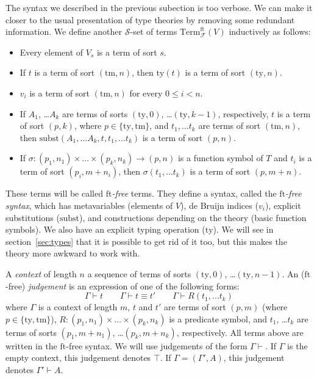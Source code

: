 \documentclass[reqno]{amsart}
\theoremstyle{definition}
\theoremstyle{remark}
\newcommand{\fs}[1]{\mathrm{#1}}
\newcommand{\Term}{\fs{Term}}
\newcommand{\subst}{\fs{subst}}
\newcommand{\ft}{\fs{ft}}
\newcommand{\ty}{\fs{ty}}
\newcommand{\tm}{\fs{tm}}
\numberwithin{figure}{section}
\begin{document}
The syntax we described in the previous subection is too verbose.
We can make it closer to the usual presentation of type theories by removing some redundant information.
We define another $\mathcal{S}$-set of terms $\Term^\ft_\mathcal{F}(V)$ inductively as follows:
\begin{itemize}
\item Every element of $V_s$ is a term of sort $s$.
\item If $t$ is a term of sort $(\tm,n)$, then $\ty(t)$ is a term of sort $(\ty,n)$.
\item $v_i$ is a term of sort $(\tm,n)$ for every $0 \leq i < n$.
\item If $A_1$, \ldots $A_k$ are terms of sorts $(\ty,0)$, \ldots $(\ty,k-1)$, respectively, $t$ is a term of sort $(p,k)$, where $p \in \{ \ty, \tm \}$, and $t_1, \ldots t_k$ are terms of sort $(\tm,n)$, then $\subst(A_1, \ldots A_k, t, t_1, \ldots t_k)$ is a term of sort $(p,n)$.
\item If $\sigma : (p_1,n_1) \times \ldots \times (p_k,n_k) \to (p,n)$ is a function symbol of $T$ and $t_i$ is a term of sort $(p_i,m+n_i)$, then $\sigma(t_1, \ldots t_k)$ is a term of sort $(p,m+n)$.
\end{itemize}
These terms will be called \emph{$\ft$-free} terms.
They define a syntax, called the \emph{$\ft$-free syntax}, which has metavariables (elements of $V$), de Bruijn indices ($v_i$), explicit substitutions ($\subst$), and constructions depending on the theory (basic function symbols).
We also have an explicit typing operation ($\ty$).
We will see in section~\ref{sec:types} that it is possible to get rid of it too, but this makes the theory more awkward to work with.

A \emph{context} of length $n$ a sequence of terms of sorts $(\ty,0)$, \ldots $(\ty,n-1)$.
An ($\ft$-free) \emph{judgement} is an expression of one of the following forms:
\[ \Gamma \vdash t \qquad \Gamma \vdash t \equiv t' \qquad \Gamma \vdash R(t_1, \ldots t_k) \]
where $\Gamma$ is a context of length $m$, $t$ and $t'$ are terms of sort $(p,m)$ (where $p \in \{ \ty, \tm \}$), $R : (p_1,n_1) \times \ldots \times (p_k,n_k)$ is a predicate symbol, and $t_1$, \ldots $t_k$ are terms of sorts $(p_1,m+n_1)$, \ldots $(p_k,m+n_k)$, respectively.
All terms above are written in the $\ft$-free syntax.
We will use judgements of the form $\Gamma \vdash$.
If $\Gamma$ is the empty context, this judgement denotes $\top$.
If $\Gamma = (\Gamma', A)$, this judgement denotes $\Gamma' \vdash A$.
\end{document}
